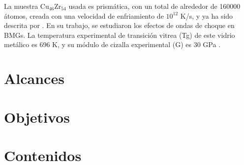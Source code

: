 La muestra Cu$_{46}$Zr$_{54}$ usada es prismática, con un total de alrededor de 160000 átomos, creada con una velocidad de enfriamiento de $10^{12}$ K/s, y ya ha sido descrita por \cite{arman10}. En su trabajo, se estudiaron los efectos de ondas de choque en BMGs. La temperatura experimental de transición vitrea (Tg) de este vidrio metálico es 696 K, y su módulo de cizalla experimental (G) es 30 GPa \citep{johnson05}. 



\section{Alcances}
\label{S1_4}



\section{Objetivos}
\label{S1_5}


\section{Contenidos}
\label{S1_6}

